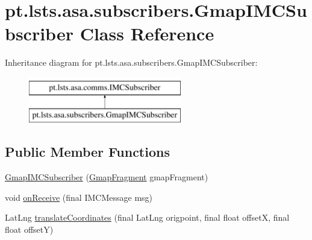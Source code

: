 \hypertarget{classpt_1_1lsts_1_1asa_1_1subscribers_1_1GmapIMCSubscriber}{}\section{pt.\+lsts.\+asa.\+subscribers.\+Gmap\+I\+M\+C\+Subscriber Class Reference}
\label{classpt_1_1lsts_1_1asa_1_1subscribers_1_1GmapIMCSubscriber}
Inheritance diagram for pt.\+lsts.\+asa.\+subscribers.\+Gmap\+I\+M\+C\+Subscriber\+:\begin{figure}[H]
\begin{center}
\leavevmode
\includegraphics[height=2.000000cm]{classpt_1_1lsts_1_1asa_1_1subscribers_1_1GmapIMCSubscriber}
\end{center}
\end{figure}
\subsection*{Public Member Functions}
\begin{DoxyCompactItemize}
\item 
\hyperlink{classpt_1_1lsts_1_1asa_1_1subscribers_1_1GmapIMCSubscriber_a555e7dd4919a5465c41ea9b8961f8e51}{Gmap\+I\+M\+C\+Subscriber} (\hyperlink{classpt_1_1lsts_1_1asa_1_1fragments_1_1GmapFragment}{Gmap\+Fragment} gmap\+Fragment)
\item 
void \hyperlink{classpt_1_1lsts_1_1asa_1_1subscribers_1_1GmapIMCSubscriber_ac6d24ac3995718323ff35de94a4155c9}{on\+Receive} (final I\+M\+C\+Message msg)
\item 
Lat\+Lng \hyperlink{classpt_1_1lsts_1_1asa_1_1subscribers_1_1GmapIMCSubscriber_ae6e89bbe61d55400f92cfd278a91699c}{translate\+Coordinates} (final Lat\+Lng origpoint, final float offset\+X, final float offset\+Y)
\end{DoxyCompactItemize}
